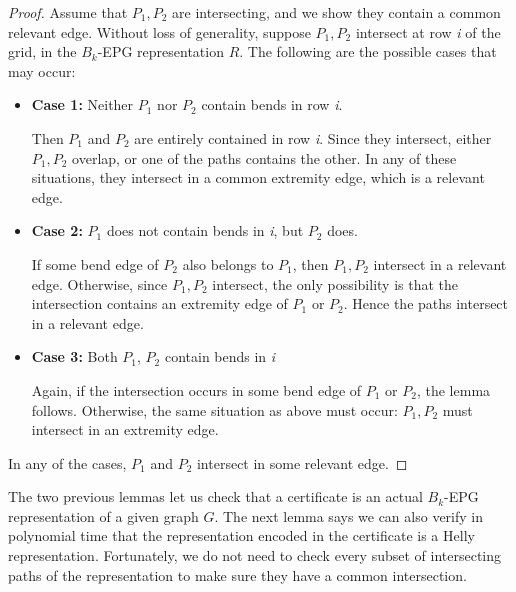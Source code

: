 \begin{proof}
Assume that $P_1, P_2$ are intersecting, and we show they contain a common relevant edge. Without loss of generality, suppose $P_1, P_2$ intersect at row \textit{i} of the grid, in the  $B_k$-EPG representation $R$. The following are the possible cases that may occur:

\begin{itemize}
\item \textbf{Case 1:} Neither $P_1$ nor $P_2$ contain bends in row \textit{i}. 

Then $P_1$ and $ P_2$  are entirely contained in row \textit{i}. Since they intersect, either $P_1, P_2$  overlap, or one of the paths contains the other. In any of these situations, they intersect in a common extremity edge, which is a relevant edge.

\item \textbf{Case 2:} $P_1$ does not contain bends in \textit{i}, but $ P_2$ does.

If some bend edge of $P_2$ also belongs to $P_1$, then $P_1, P_2$  intersect in  a relevant edge. Otherwise, since $P_1, P_2$  intersect, the only possibility is that the intersection contains an extremity edge of $P_1$ or $ P_2$. Hence the paths intersect in a relevant edge.  

\item \textbf{Case 3:} Both $P_1$,  $P_2$ contain bends in \textit{i}

Again, if the intersection occurs in some bend edge of $P_1$  or $P_2$, the lemma follows. Otherwise, the same situation as above must occur: $P_1, P_2$  must intersect in an extremity edge.
 
\end{itemize}
In any of the cases, $P_1$ and $P_2$ intersect in some relevant edge.
 \end{proof}
 
 
The two previous lemmas let us check that a certificate is an actual $B_k$-EPG representation of a given graph $G$.  The next lemma says we can also verify in polynomial time that the representation encoded in the certificate is a Helly representation. Fortunately, we do not need to check every subset of intersecting paths of the representation to make sure they have a common intersection. 


